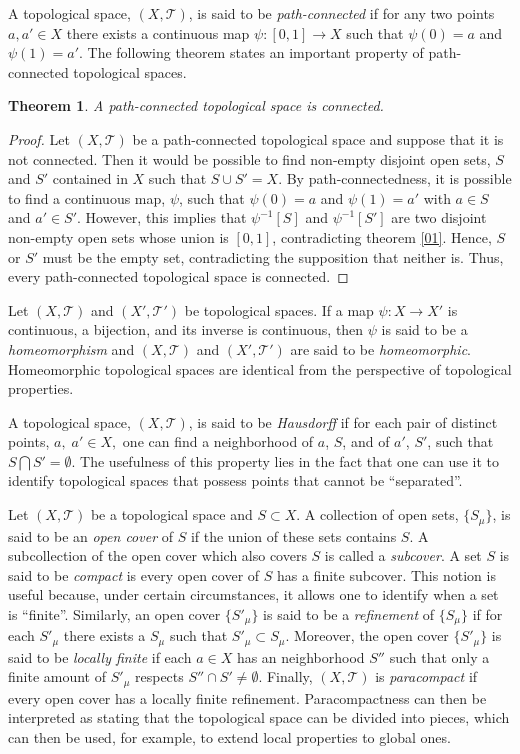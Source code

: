 \documentclass[
12pt,		%
openright,	%
twoside,  %
a4paper,			%
chapter=TITLE,		%
english,			%
french,				%
spanish,			%
brazil				%
]{USPSC-classe/USPSC}
\newtheorem{theorem}{Theorem}[section]
\begin{document}
\begin{apendicesenv}
A topological space, $(X,\mathscr{T})$, is said to be \textit{path-connected} if for any two points $a,a'\in X$ there exists a continuous map $\psi:[0,1]\to X$ such that $\psi(0)=a$ and $\psi(1)=a'$. The following theorem states an important property of path-connected topological spaces.

\begin{theorem}\label{02}
    A path-connected topological space is connected.
\end{theorem}
\begin{proof}
    Let $(X,\mathscr{T})$ be a path-connected topological space and suppose that it is not connected. Then it would be possible to find non-empty disjoint open sets, $S$ and $S'$ contained in $X$ such that $S\cup S'=X$. By path-connectedness, it is possible to find a continuous map, $\psi$, such that $\psi(0)=a$ and $\psi(1)=a'$ with $a\in S$ and $a'\in S'$. However, this implies that $\psi^{-1}[S]$ and $\psi^{-1}[S']$ are two disjoint non-empty open sets whose union is $[0,1]$, contradicting theorem \ref{01}. Hence, $S$ or $S'$ must be the empty set, contradicting the supposition that neither is. Thus, every path-connected topological space is connected.
\end{proof}

Let $(X,\mathscr{T})$ and $(X',\mathscr{T}')$ be topological spaces. If a map $\psi:X\to X'$ is continuous, a bijection, and its inverse is continuous, then $\psi$ is said to be a \textit{homeomorphism} and $(X,\mathscr{T})$ and $(X',\mathscr{T}')$ are said to be \textit{homeomorphic}. Homeomorphic topological spaces are identical from the perspective of topological properties.
 
A topological space, $(X,\mathscr{T})$, is said to be \textit{Hausdorff} if for each pair of distinct points, $a,\;a'\in X,$ one can find a neighborhood of $a$, $S$, and of $a'$, $S'$, such that $S\bigcap S'=\emptyset$. The usefulness of this property lies in the fact that one can use it to identify topological spaces that possess points that cannot be ``separated''.

Let $(X,\mathscr{T})$ be a topological space and $S\subset X$. A collection of open sets, $\{S_{\mu}\}$, is said to be an \textit{open cover} of $S$ if the union of these sets contains $S$. A subcollection of the open cover which also covers $S$ is called a \textit{subcover}. A set $S$ is said to be \textit{compact} is every open cover of $S$ has a finite subcover. This notion is useful because, under certain circumstances, it allows one to identify when a set is ``finite''. Similarly, an open cover $\{S'_{\mu}\}$ is said to be a \textit{refinement} of $\{S_{\mu}\}$ if for each $S'_{\mu}$ there exists a $S_{\mu}$ such that $S'_{\mu}\subset S_{\mu}$. Moreover, the open cover $\{S'_{\mu}\}$ is said to be \textit{locally finite} if each $a\in X$ has an neighborhood $S''$ such that only a finite amount of $S'_{\mu}$ respects $S''\cap S'\neq\emptyset$. Finally, $(X,\mathscr{T})$ is \textit{paracompact} if every open cover has a locally finite refinement. Paracompactness can then be interpreted as stating that the topological space can be divided into pieces, which can then be used, for example, to extend local properties to global ones.


\end{apendicesenv}
\end{document}
